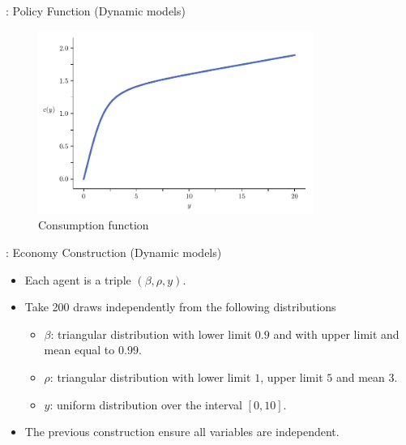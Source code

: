 \documentclass[10pt, handout]{beamer}
\begin{document}
\begin{frame}[label=Carroll-Consumption, plain, noframenumbering]{\secname: Policy Function (Dynamic models)\,\hyperlink{Carroll-Model}{\beamerreturnbutton}}
	\begin{figure}[H]
		\caption{Consumption function}
		\label{fig:concaveC}
		\includegraphics[width=0.8\textwidth]{CarrollCons}
	\end{figure}
\end{frame}

\begin{frame}[label=Carroll-Construction, plain, noframenumbering]{\secname: Economy Construction (Dynamic models)\,\hyperlink{Carroll-Example}{\beamerreturnbutton}}
	\vfill
	\begin{itemize}
		\item Each agent is a triple $(\beta,\rho,y)$. \vfill
		
		\item Take 200 draws independently from the following distributions\vspace{1ex}
				\begin{itemize}
					\item $\beta$: triangular distribution with lower limit $0.9$ and with upper limit and mean equal to $0.99$. \vspace{2ex}
					\item $\rho$: triangular distribution with lower limit $1$, upper limit $5$ and mean $3$. \vspace{2ex}
					\item $y$: uniform distribution over the interval $[0,10]$. 
				\end{itemize} \vfill
							
		\item The previous construction ensure all variables are independent.
	\end{itemize}

\end{frame}
\end{document}
